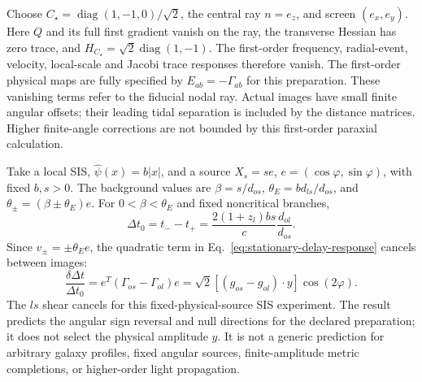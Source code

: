 Choose $C_\star=\operatorname{diag}(1,-1,0)/\sqrt2$, the central ray
$n=e_z$, and screen $(e_x,e_y)$.
Here $Q$ and its full first gradient vanish on the ray, the transverse
Hessian has zero trace, and
$H_{C_\star}=\sqrt2\operatorname{diag}(1,-1)$.
The first-order frequency, radial-event, velocity, local-scale and Jacobi
trace responses therefore vanish.  The first-order physical maps are
fully specified by $E_{ab}=-\Gamma_{ab}$ for this preparation.
These vanishing terms refer to the fiducial nodal ray. Actual images
have small finite angular offsets; their leading tidal separation is
included by the distance matrices. Higher finite-angle corrections
are not bounded by this first-order paraxial calculation.

Take a local SIS, $\widehat\psi(x)=b|x|$, and a source
$X_s=s e$, $e=(\cos\varphi,\sin\varphi)$, with fixed $b,s>0$.
The background values are $\beta=s/d_{os}$,
$\theta_E=bd_{ls}/d_{os}$, and
$\theta_\pm=(\beta\pm\theta_E)e$.
For $0<\beta<\theta_E$ and fixed noncritical branches,
\begin{equation}
 \Delta t_0=t_- -t_+
 =\frac{2(1+z_l)bs}{c}\frac{d_{ol}}{d_{os}}.
 \label{eq:sis-background-delay}
\end{equation}
Since $v_\pm=\pm\theta_E e$, the quadratic term in
Eq.~\eqref{eq:stationary-delay-response} cancels between images:
\begin{equation}
 \boxed{\frac{\delta\Delta t}{\Delta t_0}
 =e^T(\Gamma_{os}-\Gamma_{ol})e
 =\sqrt2[(g_{os}-g_{ol})\cdot y]\cos(2\varphi).}
 \label{eq:quadrupole-delay-law}
\end{equation}
The $ls$ shear cancels for this fixed-physical-source SIS experiment.
The result predicts the angular sign reversal and null directions for
the declared preparation; it does not select the physical amplitude $y$.
It is not a generic prediction for arbitrary galaxy profiles, fixed
angular sources, finite-amplitude metric completions, or higher-order
light propagation.
